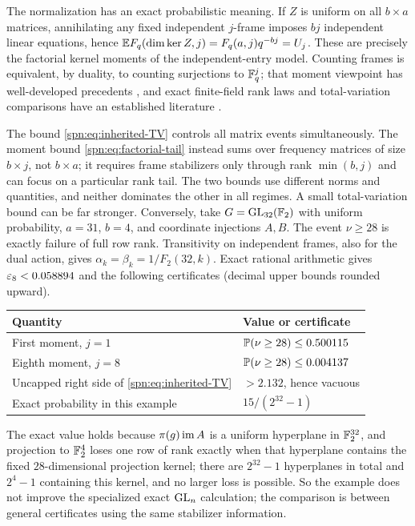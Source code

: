 The normalization has an exact probabilistic meaning. If $Z$ is uniform on all
$b\times a$ matrices, annihilating any fixed independent $j$-frame imposes
$bj$ independent linear equations, hence
$\mathbb{E} F_q(\dim\ker Z,j)=F_q(a,j)q^{-bj}=U_j$. These are precisely the
factorial kernel moments of the independent-entry model. Counting frames is
equivalent, by duality, to counting surjections to $\mathbb{F}_q^j$; that moment
viewpoint has well-developed precedents \cite{Wood2019Random}, and exact
finite-field rank laws and total-variation comparisons have an established
literature \cite{Fulman2015Stein}.

\begin{remark}\label{spn:rem:tv-vs-moments}
The bound \eqref{spn:eq:inherited-TV} controls all matrix events
simultaneously. The moment bound \eqref{spn:eq:factorial-tail} instead sums
over frequency matrices of size $b\times j$, not $b\times a$; it requires
frame stabilizers only through rank $\min(b,j)$ and can focus on a particular
rank tail. The two bounds use different norms and quantities, and neither
dominates the other in all regimes. A small total-variation bound can be far
stronger. Conversely, take $G=\operatorname{GL}_{32}(\mathbb{F}_2)$ with uniform probability,
$a=31$, $b=4$, and coordinate injections $A,B$. The event $\nu\ge28$ is
exactly failure of full row rank. Transitivity on independent frames, also
for the dual action, gives $\alpha_k=\beta_k=1/F_2(32,k)$. Exact rational
arithmetic gives $\varepsilon_8<0.058894$ and the following certificates (decimal
upper bounds rounded upward).
\begin{center}
\begin{tabular}{ll}
\toprule
Quantity & Value or certificate\\
\midrule
First moment, $j=1$ & $\mathbb{P}(\nu\ge28)\le0.500115$\\
Eighth moment, $j=8$ & $\mathbb{P}(\nu\ge28)\le0.004137$\\
Uncapped right side of \eqref{spn:eq:inherited-TV} & $>2.132$, hence vacuous\\
Exact probability in this example & $15/(2^{32}-1)$\\
\bottomrule
\end{tabular}
\end{center}
The exact value holds because $\pi(g)\operatorname{im} A$ is a uniform hyperplane in
$\mathbb{F}_2^{32}$, and projection to $\mathbb{F}_2^4$ loses one row of rank exactly when
that hyperplane contains the fixed $28$-dimensional projection kernel; there
are $2^{32}-1$ hyperplanes in total and $2^4-1$ containing this kernel, and
no larger loss is possible. So the example does not improve the specialized
exact $\operatorname{GL}_n$ calculation; the comparison is between general certificates
using the same stabilizer information.
\end{remark}

